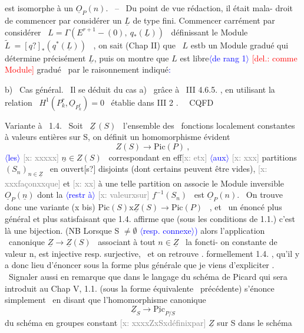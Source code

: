 \documentclass[11pt]{article}
\newcommand{\hand}[1]{\textcolor{blue}{#1}}
\newcommand{\inserted}[2][]{\textcolor{blue}{$\langle$#2$\rangle$}}
\newcommand{\deleted}[1]{\textcolor{red}{[\textsf{del.:} #1]}}
\newcommand{\xout}[1]{\textcolor{gray}{[\textsf{x:} #1]}}
\newcommand{\unsure}[1]{[#1?]}
\begin{document}
est isomorphe à un $\underline{O}_P(n)$. \ -- \ Du point de vue rédaction, il était mala-%
droit de commencer par considérer un $\underline{L}$ de type fini. Commencer carrément
par considérer \ $L = \Gamma(E^{r+1}-(0),\ q_*(\underline{L}))$ \ définissant le Module
$\tilde{L} \ = \unsure{q}_*(q^*(\underline{L}))$ \ , on sait (Chap II) que \ $L$ estb un Module gradué qui
détermine précisément $\underline{L}$, puis on montre que $L$ est libre\inserted{de rang 1} \deleted{comme Module}
gradué \ par le raisonnement indiqué\hand{:}

b) \ Cas général. \ Il se déduit du cas a) \ grâce à \ III 4.6.5. , en
utilisant la relation \ $H^1(P^r_k,\underline{O}_{P^r_k}) = 0$ \ établie dans III 2 . \ \ CQFD

Variante à \ 1.4. \ Soit \ $\underline{Z}\,(S)$ \ l'ensemble des \ fonctions localement
constantes à valeurs entières sur S, on définit un homomorphisme évident
\[ Z(S) \longrightarrow \mathrm{Pic}(P) \ , \]
\inserted{les} \xout{xxxxx} $\underline{n} \in Z(S)$ \ correspondant en eff\xout{etx} \inserted{aux} \xout{xxx} partitions $(S_n)_{n\in\underline{Z}}$ \ en ouvert\unsure{s}
disjoints (dont certains peuvent être vides), \xout{xxxfaçonxxque} et \xout{xx} à une
telle partition on associe le Module inversible $\underline{O}_P(\underline{n})$ dont la \inserted{restr à} \xout{valeurxsur}
$f^{-1}(S_n)$ \ est $\underline{O}_P(n)$. \ On trouve donc une variante
(x bis) \hfill $\mathrm{Pic}(S)\mathrm{x}\underline{Z}(S) \longrightarrow \mathrm{Pic}(P)$ \ , \hfill
et \ un énoncé plus général et plus satisfaisant que 1.4. affirme que
(sous les conditions de 1.1.) c'est là une bijection. (NB Lorsque S $\neq \emptyset$
\inserted[typed]{resp. connexe}\hand{)}
alors l'application \ canonique $\underline{Z} \to \underline{Z}(S)$ \ associant à tout $n \in \underline{Z}$ \ la foncti-%
on constante de valeur n, est injective resp. surjective, \ et on retrouve .
formellement 1.4. , qu'il y a donc lieu d'énoncer sous la forme plus
générale que je viens d'expliciter . \ Signaler aussi en remarque que
dans le langage du schéma de Picard qui sera introduit au Chap V, 1.1.
(sous la forme équivalente \ précédente) s'énonce simplement \ en disant que
l'homomorphisme canonique
\[ \underline{Z}_S \longrightarrow \underline{\mathrm{Pic}}_{P/S} \]
du schéma en groupes constant \xout{xxxxZxSxdéfinixpar} $\underline{Z}$ sur S dans le schéma
\end{document}
